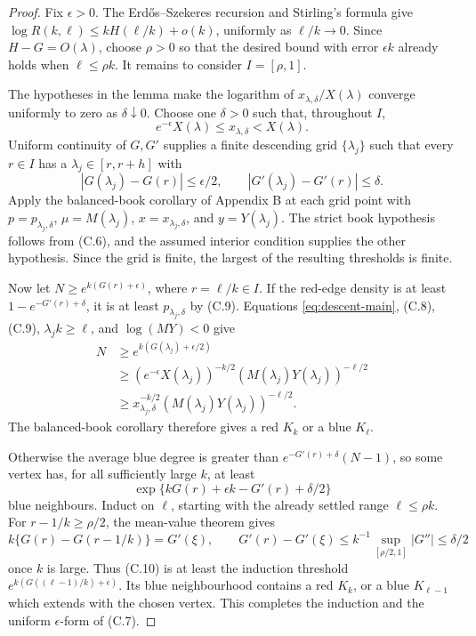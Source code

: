 \begin{proof}
Fix \(\epsilon>0\).  The Erd\H{o}s--Szekeres recursion and Stirling's
formula give \(\log R(k,\ell)\le kH(\ell/k)+o(k)\), uniformly as
\(\ell/k\to0\).  Since \(H-G=O(\lambda)\), choose \(\rho>0\) so that
the desired bound with error \(\epsilon k\) already holds when
\(\ell\le\rho k\).  It remains to consider \(I=[\rho,1]\).

The hypotheses in the lemma make the logarithm of
\(x_{\lambda,\delta}/X(\lambda)\) converge uniformly to zero as
\(\delta\downarrow0\).  Choose one \(\delta>0\) such that, throughout
\(I\),
\[
 e^{-\epsilon}X(\lambda)\le x_{\lambda,\delta}<X(\lambda).
 \tag{C.8}
\]
Uniform continuity of \(G,G'\) supplies a finite descending grid
\(\{\lambda_j\}\) such that every \(r\in I\) has a
\(\lambda_j\in[r,r+h]\) with
\[
 |G(\lambda_j)-G(r)|\le\epsilon/2,\qquad
 |G'(\lambda_j)-G'(r)|\le\delta.             \tag{C.9}
\]
Apply the balanced-book corollary of Appendix B at each grid point with
\(p=p_{\lambda_j,\delta}\), \(\mu=M(\lambda_j)\),
\(x=x_{\lambda_j,\delta}\), and \(y=Y(\lambda_j)\).  The strict book
hypothesis follows from (C.6), and the assumed interior condition supplies
the other hypothesis.  Since the grid is finite, the largest of the
resulting thresholds is finite.

Now let \(N\ge e^{k(G(r)+\epsilon)}\), where \(r=\ell/k\in I\).  If the
red-edge density is at least \(1-e^{-G'(r)+\delta}\), it is at least
\(p_{\lambda_j,\delta}\) by (C.9).  Equations
\eqref{eq:descent-main}, (C.8), (C.9),
\(\lambda_jk\ge\ell\), and \(\log(MY)<0\) give
\begin{align*}
 N&\ge e^{k(G(\lambda_j)+\epsilon/2)}\\
  &\ge (e^{-\epsilon}X(\lambda_j))^{-k/2}
       (M(\lambda_j)Y(\lambda_j))^{-\ell/2}\\
  &\ge x_{\lambda_j,\delta}^{-k/2}
       (M(\lambda_j)Y(\lambda_j))^{-\ell/2}.
\end{align*}
The balanced-book corollary therefore gives a red \(K_k\) or a blue
\(K_\ell\).

Otherwise the average blue degree is greater than
\(e^{-G'(r)+\delta}(N-1)\), so some vertex has, for all sufficiently large
\(k\), at least
\[
 \exp\{kG(r)+\epsilon k-G'(r)+\delta/2\}       \tag{C.10}
\]
blue neighbours.  Induct on \(\ell\), starting with the already settled
range \(\ell\le\rho k\).  For \(r-1/k\ge\rho/2\), the mean-value theorem
gives
\[
 k\{G(r)-G(r-1/k)\}=G'(\xi),\qquad
 G'(r)-G'(\xi)\le k^{-1}
  \sup_{[\rho/2,1]}|G''|\le\delta/2
\]
once \(k\) is large.  Thus (C.10) is at least the induction threshold
\(e^{k(G((\ell-1)/k)+\epsilon)}\).  Its blue neighbourhood contains a red
\(K_k\), or a blue \(K_{\ell-1}\) which extends with the chosen vertex.
This completes the induction and the uniform \(\epsilon\)-form of (C.7).
\end{proof}

